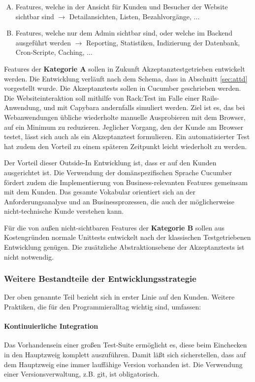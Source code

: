 \begin{enumerate}[A.]
 
 \item Features, welche in der Ansicht für Kunden und Besucher der Website sichtbar sind $\to$ Detailansichten, Listen, Bezahlvorgänge, ...
 \item Features, welche nur dem Admin sichtbar sind, oder welche im Backend ausgeführt werden $\to$ Reporting, Statistiken, Indizierung der Datenbank, Cron-Scripte, Caching, ...
\end{enumerate}

Features der \textbf{Kategorie A} sollen in Zukunft Akzeptanztestgetrieben entwickelt werden. Die Entwicklung verläuft nach dem Schema, dass in Abschnitt \ref{sec:attd} vorgestellt wurde. Die Akzeptanztests sollen in Cucumber geschrieben werden. Die Websiteinteraktion soll mithilfe von Rack:Test im Falle einer Rails-Anwendung, und mit Capybara andernfalls simuliert werden.
Ziel ist es, das bei Webanwendungen übliche wiederholte manuelle Ausprobieren mit dem Browser, auf ein Minimum zu reduzieren. Jeglicher Vorgang, den der Kunde am Browser testet, lässt sich auch als ein Akzeptanztest formulieren. Ein automatisierter Test hat zudem den Vorteil zu einem späteren Zeitpunkt leicht wiederholt zu werden. 

Der Vorteil dieser Outside-In Entwicklung ist, dass er auf den Kunden ausgerichtet ist. Die Verwendung der domänspezifischen Sprache Cucumber fördert zudem die Implementierung von Business-relevanten Features gemeinsam mit dem Kunden. Das gesamte Vokabular orientiert sich an der Anforderungsanalyse und an Businessprozessen, die auch der möglicherweise nicht-technische Kunde verstehen kann.

Für die von außen nicht-sichtbaren Features der \textbf{Kategorie B} sollen aus Kostengründen normale Unittests entwickelt nach der klassischen Testgetriebenen Entwicklung genügen. Die zusätzliche Abstraktionsebene der Akzeptanztests ist nicht notwendig.

\subsubsection{Weitere Bestandteile der Entwicklungsstrategie}

Der oben genannte Teil bezieht sich in erster Linie auf den Kunden. Weitere Praktiken, die für den Programmieralltag wichtig sind, umfassen:

\paragraph{Kontinuierliche Integration} Das Vorhandensein einer großen Test-Suite ermöglicht es, diese beim Einchecken in den Hauptzweig komplett auszuführen. Damit läßt sich sicherstellen, dass auf dem Hauptzweig eine immer lauffähige Version vorhanden ist. Die Verwendung einer Versionsverwaltung, z.B. git, ist obligatorisch.

